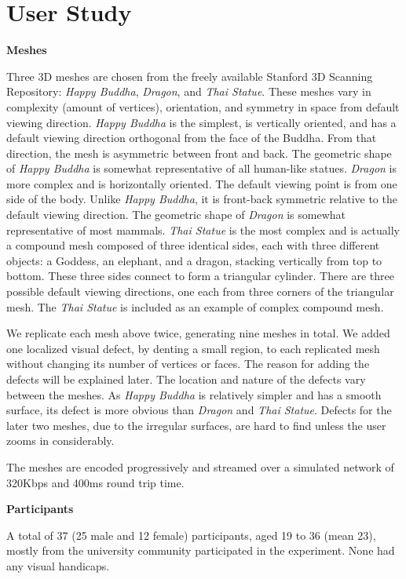 \section{User Study}
\label{s:user:study}
\textbf{Meshes}

Three 3D meshes are chosen from the freely available
Stanford 3D Scanning Repository:   %
\textit{Happy Buddha}, \textit{Dragon}, and \textit{Thai Statue}.
These meshes vary in complexity (amount of vertices), orientation, and
symmetry in space from default viewing direction. \textit{Happy Buddha} is the
simplest, is vertically oriented, and has a default viewing direction
orthogonal from the face of the Buddha. From that direction, the mesh is
asymmetric between front and back. The geometric shape of \textit{Happy Buddha} is
somewhat representative of all human-like statues. \textit{Dragon} is more complex
and is horizontally oriented. The default viewing point is from one
side of the body. Unlike \textit{Happy Buddha}, it is front-back symmetric
relative to the default viewing direction. The geometric shape of \textit{Dragon} is
somewhat representative of most mammals. \textit{Thai Statue} is the most complex
and is actually a compound mesh composed of three identical sides, each 
with three different objects: a Goddess, an elephant, and a dragon,
stacking vertically from top to bottom.  These three sides connect to
form a triangular cylinder. There are three possible default
viewing directions, one each from three corners of the triangular mesh. The
\textit{Thai Statue} is included as an example of complex compound mesh.

We replicate each mesh above twice, generating nine meshes in total.  
We added one localized visual defect, by denting a small region, to each replicated mesh 
without changing its number of vertices or faces. The reason for adding the defects will be explained later. 
The location and nature of the
defects vary between the meshes. As \textit{Happy Buddha} is
relatively simpler and has a smooth surface, its defect is
 more obvious than \textit{Dragon}
and \textit{Thai Statue}.  Defects for the later two meshes, due to the
irregular surfaces, are hard to find unless the user zooms in
considerably.

The meshes are encoded progressively and streamed over a simulated network of 320Kbps and 400ms round trip time.  

\textbf{Participants}

A total of 37 (25 male and 12 female) participants, aged 19 to 36
(mean 23), mostly from the university community participated in the
experiment. None had any visual handicaps.

